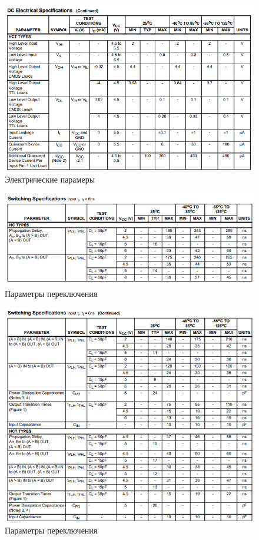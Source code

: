 \begin{figure}[H]
	\centering
	\includegraphics[width=0.95\linewidth]{imgs/6/ti2}
	\caption{Электрические парамеры}
	\label{fig:6_ti2}
\end{figure}

\begin{figure}[H]
	\centering
	\includegraphics[width=0.95\linewidth]{imgs/6/ti3}
	\caption{Параметры переключения}
	\label{fig:6_ti3}
\end{figure}


\begin{figure}[H]
	\centering
	\includegraphics[width=0.95\linewidth]{imgs/6/ti4}
	\caption{Параметры переключения}
	\label{fig:6_ti4}
\end{figure}
